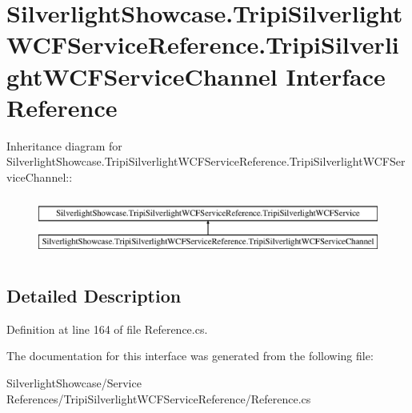 \hypertarget{interface_silverlight_showcase_1_1_tripi_silverlight_w_c_f_service_reference_1_1_tripi_silverlight_w_c_f_service_channel}{
\section{SilverlightShowcase.TripiSilverlightWCFServiceReference.TripiSilverlightWCFServiceChannel Interface Reference}
\label{interface_silverlight_showcase_1_1_tripi_silverlight_w_c_f_service_reference_1_1_tripi_silverlight_w_c_f_service_channel}
}
Inheritance diagram for SilverlightShowcase.TripiSilverlightWCFServiceReference.TripiSilverlightWCFServiceChannel::\begin{figure}[H]
\begin{center}
\leavevmode
\includegraphics[height=2cm]{interface_silverlight_showcase_1_1_tripi_silverlight_w_c_f_service_reference_1_1_tripi_silverlight_w_c_f_service_channel}
\end{center}
\end{figure}


\subsection{Detailed Description}


Definition at line 164 of file Reference.cs.

The documentation for this interface was generated from the following file:\begin{DoxyCompactItemize}
\item 
SilverlightShowcase/Service References/TripiSilverlightWCFServiceReference/Reference.cs\end{DoxyCompactItemize}
